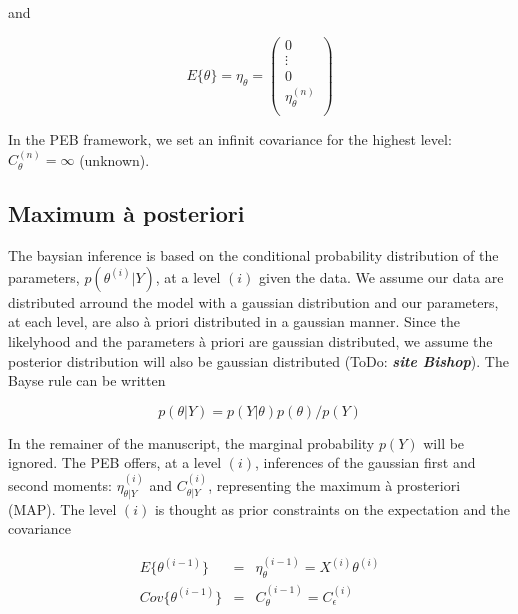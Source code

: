 \documentclass[final, paper=letter,5p,times,twocolumn]{elsarticle}
\newcommand{\ToDo}[1]{ToDo: \textbf{\textit{#1}}}
\theoremstyle{definition}
\begin{document}
and

\begin{equation}
  E\{\theta\} = \eta_{\theta} = \left (
  \begin{array}{c}
   0 \\
   \vdots  \\
   0  \\
   \eta_{\theta}^{(n)}\\
  \end{array}
  \right )
  \label{eta_theta}
\end{equation}


In the PEB framework, we set an infinit covariance for the highest level: $C_{\theta}^{(n)} = \infty$ (unknown).

\subsection{Maximum \`a posteriori}

The baysian inference is based on the conditional probability distribution of the parameters, $p(\theta^{(i)}|Y)$, at a level $(i)$ given the data. We assume our data are distributed arround the model with a gaussian distribution and our parameters, at each level, are also \`a priori distributed in a gaussian manner. Since the likelyhood and the parameters \`a priori are gaussian distributed, we assume the posterior distribution will also be gaussian distributed (\ToDo{site Bishop}). The Bayse rule can be written

\begin{equation}
  p(\theta | Y) =   p(Y | \theta) p(\theta) / p(Y) 
\end{equation}

In the remainer of the manuscript, the marginal probability $p(Y)$ will be ignored. The PEB offers, at a level $(i)$, inferences of the gaussian first and second moments: $\eta_{\theta|Y}^{(i)}$ and $C_{\theta|Y}^{(i)}$, representing the maximum \`a prosteriori (MAP). The level $(i)$ is thought as prior constraints on the expectation and the covariance


\begin{equation}
  \left .
  \begin{array}{rcl}
    E\{\theta^{(i-1)}\}   & = & \eta_{\theta}^{(i-1)} = X^{(i)}\theta^{(i)} \\
    Cov\{\theta^{(i-1)}\} & = & C_{\theta}^{(i-1)} = C_{\epsilon}^{(i)}\\
  \end{array}
  \right .
  \label{Prior_constraint}
\end{equation}
\end{document}

